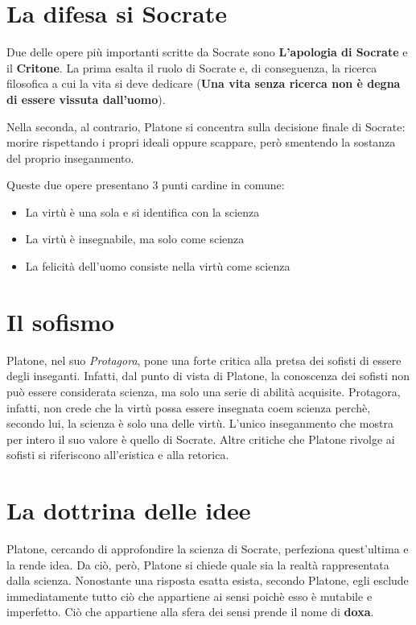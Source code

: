 \documentclass[10pt,a4paper]{article}
\begin{document}
   \section{La difesa si Socrate}

   Due delle opere più importanti scritte da Socrate sono \textbf{L'apologia di Socrate} e il \textbf{Critone}.
   La prima esalta il ruolo di Socrate e, di conseguenza, la ricerca filosofica a cui la vita si deve dedicare (\textbf{Una vita senza ricerca non è degna di essere vissuta dall'uomo}).

   Nella seconda, al contrario, Platone si concentra sulla decisione finale di Socrate: morire rispettando i propri ideali oppure scappare, però smentendo la sostanza del proprio inseganmento.

   Queste due opere presentano 3 punti cardine in comune:
   \begin{itemize}
     \item La virtù è una sola e si identifica con la scienza
     \item La virtù è insegnabile, ma solo come scienza
     \item La felicità dell'uomo consiste nella virtù come scienza
   \end{itemize}

   \section{Il sofismo}

   Platone, nel suo \textit{Protagora}, pone una forte critica alla pretsa dei sofisti di essere degli inseganti. Infatti, dal punto di vista di Platone, la conoscenza dei sofisti non può essere considerata scienza, ma solo una serie di abilità acquisite. Protagora, infatti, non crede che la virtù possa essere insegnata coem scienza perchè, secondo lui, la scienza è solo una delle virtù. L'unico inseganmento che mostra per intero il suo valore è quello di Socrate. Altre critiche che Platone rivolge ai sofisti si riferiscono all'eristica e alla retorica.

	 \section{La dottrina delle idee}

	 Platone, cercando di approfondire la scienza di Socrate, perfeziona quest'ultima e la rende idea. Da ciò, però, Platone si chiede quale sia la realtà rappresentata dalla scienza. Nonostante una risposta esatta esista, secondo Platone, egli esclude immediatamente tutto ciò che appartiene ai sensi poichè esso è mutabile e imperfetto. Ciò che appartiene alla sfera dei sensi prende il nome di \textbf{doxa}.
\end{document}
